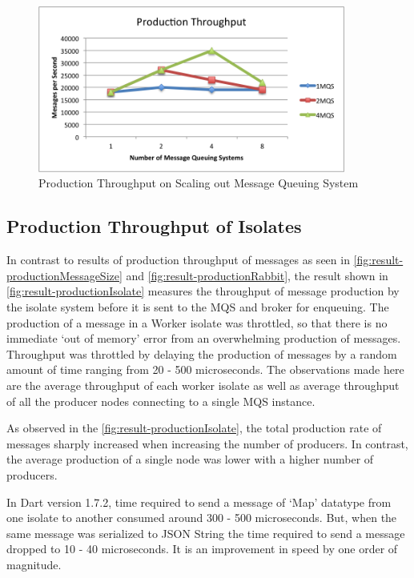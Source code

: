 \begin{figure}[H]
  \centering  \includegraphics[width=0.9\textwidth]{figures/05productionRabbit}
  \caption[Production Throughput on Scaling out Message Queuing System]{Production Throughput on Scaling out Message Queuing System}
  \label{fig:result-productionRabbit}
\end{figure}


\subsection{Production Throughput of Isolates}
  In contrast to results of production throughput of messages as seen in \autoref{fig:result-productionMessageSize} and \autoref{fig:result-productionRabbit}, the result shown in
 \autoref{fig:result-productionIsolate} measures the throughput of message production by the isolate system before it is sent to the MQS and broker for enqueuing. The production of a message in a Worker isolate was throttled, so that there is no immediate ‘out of memory’ error from an overwhelming production of messages. Throughput was throttled by delaying the production of messages by a random amount of time ranging from 20 - 500 microseconds. The observations made here are the average throughput of each worker isolate as well as average throughput of all the producer nodes connecting to a single MQS instance.

  As observed in the \autoref{fig:result-productionIsolate}, the total production rate of messages sharply increased when increasing the number of producers. In contrast, the average production of a single node was lower with a higher number of producers.

  In Dart version 1.7.2, time required to send a message of ‘Map’ datatype from one isolate to another consumed around 300 - 500 microseconds. But, when the same message was serialized to JSON String the time required to send a message dropped to 10 - 40 microseconds. It is an improvement in speed by one order of magnitude.

